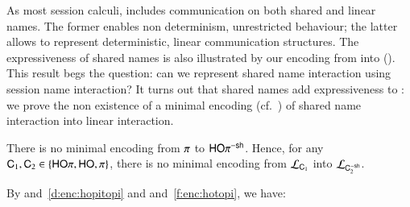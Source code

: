 \documentclass[runningheads]{llncs}
\begin{document}
{As most session calculi, 
\HOp includes communication on both shared and linear names.
The former enables non determinism, unrestricted behaviour; the latter allows to represent
deterministic, linear communication structures.
The expressiveness of shared names is also illustrated by our 
encoding from \HOp into \sessp ().
This result begs the question: 
can we represent shared name interaction using session name interaction?
It turns out that shared names  add expressiveness to \HOp:
we prove
the non existence of a minimal encoding 
(cf.~)
of shared name 
interaction into linear interaction. %


\begin{theorem}%
	\label{t:negative}
	There is no minimal encoding from
		$\pi$ to $\mathsf{HO}\pi^{\mathsf{-sh}}$.
	Hence, for any
		$\mathsf{C}_1,\mathsf{C}_2\in \{ \mathsf{HO}\pi, \mathsf{HO}, \pi\}$, 
	there is no minimal encoding from  
	$\mathcal{L}_{\mathsf{C}_1}$ 
	into
		$\mathcal{L}_{\mathsf{C}_2^{-\mathsf{sh}}}$.
\end{theorem}


By 
	 and~\ref{d:enc:hopitopi} 
	and  and~\ref{f:enc:hotopi}, 
we have:
\smallskip 
{}


}
\end{document}
